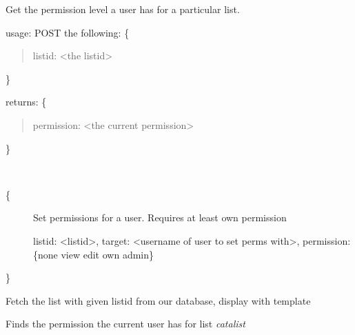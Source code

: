 \documentclass[letterpaper,10pt,english]{sphinxmanual}
\begin{document}
\begin{fulllineitems}
\label{index:routes.permissions_get}
Get the permission level a user has for a particular list.

usage: POST the following:
\{
\begin{quote}

listid: \textless{}the listid\textgreater{}
\end{quote}

\}

returns:
\{
\begin{quote}

permission: \textless{}the current permission\textgreater{}
\end{quote}

\}

\end{fulllineitems}


\begin{fulllineitems}
\label{index:routes.permissions_set}~\begin{description}
\item[{\{}] \leavevmode
Set permissions for a user. Requires at least own permission

listid: \textless{}listid\textgreater{},
target: \textless{}username of user to set perms with\textgreater{},
permission: \{none \textbar{} view \textbar{} edit \textbar{} own \textbar{} admin\}

\end{description}

\}

\end{fulllineitems}


\begin{fulllineitems}
\label{index:routes.preview_list}
Fetch the list with given listid from our database,
display with template

\end{fulllineitems}


\begin{fulllineitems}
\label{index:routes.query_cur_perm}
Finds the permission the current user has for list \emph{catalist}

\end{fulllineitems}
\end{document}
